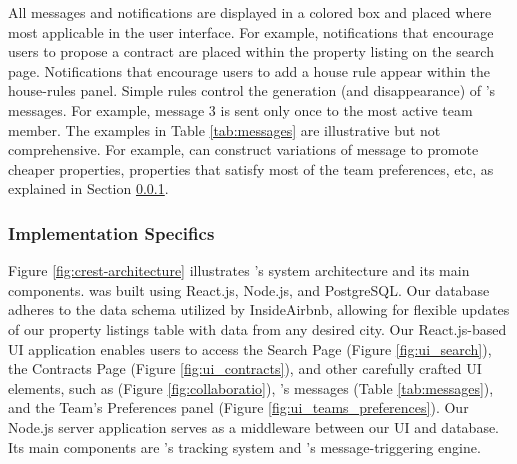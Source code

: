 All \cbot messages and notifications are displayed in a colored box and placed where most applicable in the user interface. For example, notifications that encourage users to propose a contract are placed within the property listing on the search page. Notifications that encourage users to add a house rule appear within the house-rules panel. Simple rules control the generation (and disappearance) of \cbot's messages. For example, message 3 is sent only once to the most active team member. The examples in Table \ref{tab:messages} are illustrative but not comprehensive. For example, \cbot can construct variations of message \label{msg:highestrated} to promote cheaper properties, properties that satisfy most of the team preferences, etc, as explained in Section \ref{sssection:implementation}.

\subsubsection{Implementation Specifics}
\label{sssection:implementation}

Figure \ref{fig:crest-architecture} illustrates \tool's system architecture and its main components. \tool was built using React.js, Node.js, and PostgreSQL.
Our database adheres to the data schema utilized by InsideAirbnb\cite{insideairbnb}, allowing for flexible updates of our property listings table with data from any desired city. Our React.js-based UI application enables users to access the Search Page (Figure \ref{fig:ui_search}), the Contracts Page (Figure \ref{fig:ui_contracts}), and other carefully crafted UI elements, such as \collaboRatio (Figure \ref{fig:collaboratio}), \cbot's messages (Table \ref{tab:messages}), and the Team's Preferences panel (Figure \ref{fig:ui_teams_preferences}). Our Node.js server application serves as a middleware between our UI and database. Its main components are
\collaboRatio's tracking system and \cbot's message-triggering engine.

